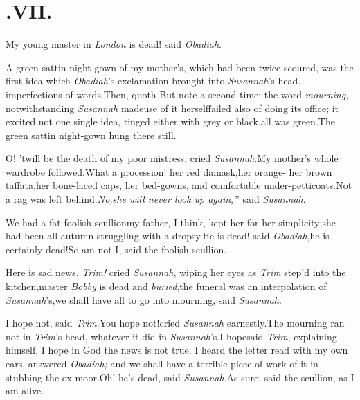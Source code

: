 \documentclass{article}
\begin{document}
\section{.\enspace  VII.}

\enlargethispage{2\baselineskip}

\quad\tsh My young master in \textit{London} is dead!
said \textit{Obadiah}.\tsk

\tsk  A green sattin night-gown of my mother’s,
which had been twice scoured, was the first idea which
\textit{Obadiah}’s exclamation brought into
\textit{Susannah}’s head.\tsk\break 
{}
imperfections of words.\tsk Then, quoth\break
{}\break
\tsk But note a second time: the word
\textit{mou\-rning}, notwithstanding \textit{Susannah}
made\break use of it
herself\tsk failed also of doing its office; it excited not one
single idea, tinged either with grey or black,\tsk all was
green.\tsh The green sattin night-gown hung there
still.

\tsk O! ’twill be the death of my poor mistress, cried
\textit{Susannah}.\tsk My mother’s whole wardrobe
followed.\tsk What a procession! her red damask,\tsk her
orange-\break
{}\break
\tsk her brown taffata,\tsk her bone-laced caps, her bed-gowns, and
comfortable\break
under-petticoats.\tsk Not a rag was left
behind.\tsh \lqq\textit{No,\tsk she will never look up
again},\,” said \textit{Susannah}.

We had a fat foolish scullion\tsk my father, I think, kept
her for her simplicity;\break\tsk she had been all autumn struggling
with a dropsy.\tsk He is dead! said \textit{Obadiah},\tsk he is
certainly dead!\tsk So am not I, said the foolish scullion.

\tsh  Here is sad news, \textit{Trim!} cried
\textit{Susannah}, wiping her eyes as \textit{Trim} step’d 
into the kitchen,\tsk master \textit{Bobby} is dead and
\textit{buried},\tsk the funeral was an interpolation of
\textit{Susannah}’s,\tsk we shall have all to go into
mourning, said \textit{Susannah}.

I hope not, said \textit{Trim}.\tsk You hope not!\break cried
\textit{Susannah} earnestly.\tsk The mourning ran not in
\textit{Trim}’s head, whatever it did in
\textit{Susannah}’s.\tsk I hope\tsk said \textit{Trim},
explaining himself, I hope in God the news is not true. I heard the
letter read with my own ears, answered \textit{Obadiah;} and we shall
have a terrible piece of work of it in stubbing the
ox-moor.\tsk Oh! he’s dead, said \textit{Susannah}.\tsk As
sure, said the scullion, as I am alive.
\end{document}

